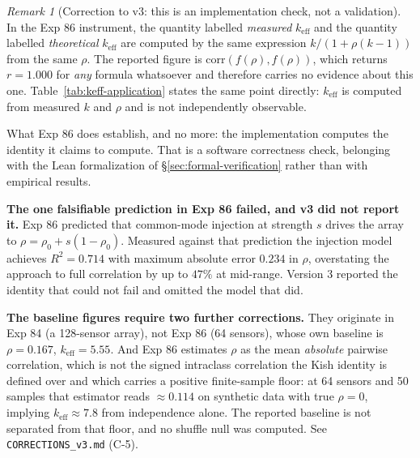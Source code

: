 \documentclass[11pt,a4paper]{article}
\theoremstyle{definition}
\theoremstyle{remark}
\newtheorem{remark}{Remark}[section]
\newcommand{\keff}{k_{\text{eff}}}
\begin{document}
\begin{remark}[Correction to v3: this is an implementation check, not a validation]
\label{rem:exp86-identity}
In the Exp 86 instrument, the quantity labelled \emph{measured} $\keff$ and the quantity labelled \emph{theoretical} $\keff$ are computed by the same expression $k/(1+\rho(k-1))$ from the same $\rho$. The reported figure is $\mathrm{corr}(f(\rho), f(\rho))$, which returns $r = 1.000$ for \emph{any} formula whatsoever and therefore carries no evidence about this one. Table~\ref{tab:keff-application} states the same point directly: $\keff$ is computed from measured $k$ and $\rho$ and is not independently observable.

What Exp 86 does establish, and no more: the implementation computes the identity it claims to compute. That is a software correctness check, belonging with the Lean formalization of \S\ref{sec:formal-verification} rather than with empirical results.

\textbf{The one falsifiable prediction in Exp 86 failed, and v3 did not report it.} Exp 86 predicted that common-mode injection at strength $s$ drives the array to $\rho = \rho_0 + s(1-\rho_0)$. Measured against that prediction the injection model achieves $R^2 = 0.714$ with maximum absolute error $0.234$ in $\rho$, overstating the approach to full correlation by up to $47\%$ at mid-range. Version 3 reported the identity that could not fail and omitted the model that did.

\textbf{The baseline figures require two further corrections.} They originate in Exp 84 (a 128-sensor array), not Exp 86 (64 sensors), whose own baseline is $\rho = 0.167$, $\keff = 5.55$. And Exp 86 estimates $\rho$ as the mean \emph{absolute} pairwise correlation, which is not the signed intraclass correlation the Kish identity is defined over and which carries a positive finite-sample floor: at 64 sensors and 50 samples that estimator reads $\approx 0.114$ on synthetic data with true $\rho = 0$, implying $\keff \approx 7.8$ from independence alone. The reported baseline is not separated from that floor, and no shuffle null was computed. See \texttt{CORRECTIONS\_v3.md} (C-5).
\end{remark}
\end{document}
